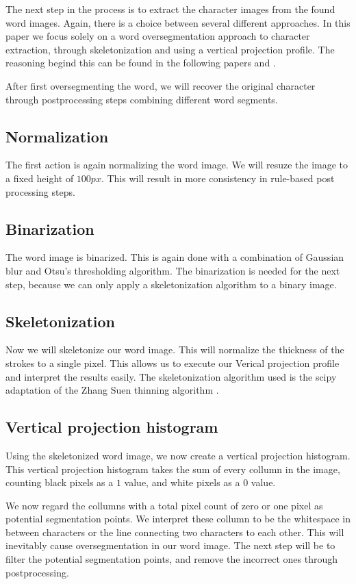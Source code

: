 \documentclass{article}
\begin{document}
The next step in the process is to extract the character images from the found word images.
Again, there is a choice between several different approaches.
In this paper we focus solely on a word oversegmentation approach to character extraction, through skeletonization and using a vertical projection profile. The reasoning begind this can be found in the following papers \cite{CharSegm} and \cite{CharSegmOld}.

After first oversegmenting the word, we will recover the original character through postprocessing steps combining different word segments.

\subsection{Normalization}
The first action is again normalizing the word image.
We will resuze the image to a fixed height of $100px$.
This will result in more consistency in rule-based post processing steps.

\subsection{Binarization}
The word image is binarized.
This is again done with a combination of Gaussian blur and Otsu's thresholding algorithm.
The binarization is needed for the next step, because we can only apply a skeletonization algorithm to a binary image.


\subsection{Skeletonization}
Now we will skeletonize our word image.
This will normalize the thickness of the strokes to a single pixel.
This allows us to execute our Verical projection profile and interpret the results easily.
The skeletonization algorithm used is the scipy adaptation of the Zhang Suen thinning algorithm \cite{zsthinning}.

\subsection{Vertical projection histogram}
Using the skeletonized word image, we now create a vertical projection histogram.
This vertical projection histogram takes the sum of every collumn in the image, counting black pixels as a $1$ value, and white pixels as a $0$ value.

We now regard the collumns with a total pixel count of zero or one pixel as potential segmentation points.
We interpret these collumn to be the whitespace in between characters or the line connecting two characters to each other.
This will inevitably cause oversegmentation in our word image.
The next step will be to filter the potential segmentation points, and remove the incorrect ones through postprocessing.
\end{document}
